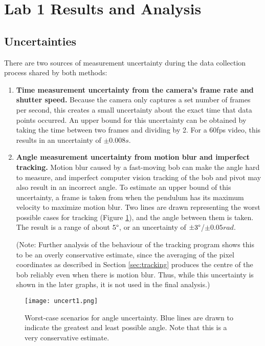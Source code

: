\documentclass[aps,twocolumn,secnumarabic,nobalancelastpage,amsmath,amssymb,nofootinbib,floatfix,letterpaper]{revtex4}
\begin{document}
\section{Lab 1 Results and Analysis}

\subsection{Uncertainties}
\label{sec:lab1_uncert}

There are two sources of measurement uncertainty during the data collection process shared by both methods:
\begin{enumerate}
    \item 
        \textbf{Time measurement uncertainty from the camera's frame rate and shutter speed.} Because the camera only
        captures a set number of frames per second, this creates a small uncertainty about the exact time that data
        points occurred. An upper bound for this uncertainty can be obtained by taking the time between two frames and
        dividing by 2. For a 60fps video, this results in an uncertainty of \(\pm 0.008\si{s}\).
    \item
        \textbf{Angle measurement uncertainty from motion blur and imperfect tracking.} Motion blur caused by a
        fast-moving bob can make the angle hard to measure, and imperfect computer vision tracking of the bob and
        pivot may also result in an incorrect angle. To estimate an upper bound of this uncertainty, a frame is taken
        from when the pendulum has its maximum velocity to maximize motion blur. Two lines are drawn representing the
        worst possible cases for tracking (Figure \ref{fig:angle_uncert}), and the angle between them is taken. The
        result is a range of about \(5\degree\), or an uncertainty of \(\pm 3\degree\)/\(\pm 0.05\si{rad}\).
        
        (Note: Further analysis of the behaviour of the tracking program shows this to be an overly conservative
        estimate, since the averaging of the pixel coordinates as described in Section \ref{sec:tracking} produces the
        centre of the bob reliably even when there is motion blur. Thus, while this uncertainty is shown in the later
        graphs, it is not used in the final analysis.)
\end{enumerate}
\begin{figure}[htb]
    \texttt{[image: uncert1.png]}
    \caption{Worst-case scenarios for angle uncertainty. Blue lines are drawn to indicate the greatest and least
        possible angle. Note that this is a very conservative estimate.}
    \label{fig:angle_uncert}
\end{figure}
\end{document}
